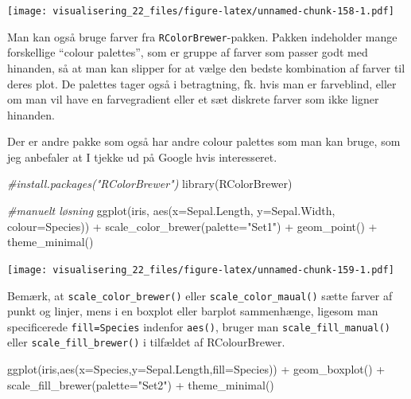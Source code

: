 \documentclass[
]{book}
\newenvironment{Shaded}{\begin{snugshade}}{\end{snugshade}}
\newcommand{\AttributeTok}[1]{\textcolor[rgb]{0.77,0.63,0.00}{#1}}
\newcommand{\CommentTok}[1]{\textcolor[rgb]{0.56,0.35,0.01}{\textit{#1}}}
\newcommand{\FunctionTok}[1]{\textcolor[rgb]{0.00,0.00,0.00}{#1}}
\newcommand{\NormalTok}[1]{#1}
\newcommand{\SpecialCharTok}[1]{\textcolor[rgb]{0.00,0.00,0.00}{#1}}
\newcommand{\StringTok}[1]{\textcolor[rgb]{0.31,0.60,0.02}{#1}}
\begin{document}
\texttt{[image: visualisering\_22\_files/figure-latex/unnamed-chunk-158-1.pdf]}

Man kan også bruge farver fra \texttt{RColorBrewer}-pakken. Pakken indeholder mange forskellige ``colour palettes'', som er gruppe af farver som passer godt med hinanden, så at man kan slipper for at vælge den bedste kombination af farver til deres plot. De palettes tager også i betragtning, fk. hvis man er farveblind, eller om man vil have en farvegradient eller et sæt diskrete farver som ikke ligner hinanden.

Der er andre pakke som også har andre colour palettes som man kan bruge, som jeg anbefaler at I tjekke ud på Google hvis interesseret.

\begin{Shaded}
\begin{Highlighting}[]
\CommentTok{\#install.packages("RColorBrewer")}
\FunctionTok{library}\NormalTok{(RColorBrewer)}

\CommentTok{\#manuelt løsning}
\FunctionTok{ggplot}\NormalTok{(iris, }\FunctionTok{aes}\NormalTok{(}\AttributeTok{x=}\NormalTok{Sepal.Length, }\AttributeTok{y=}\NormalTok{Sepal.Width, }\AttributeTok{colour=}\NormalTok{Species)) }\SpecialCharTok{+}
  \FunctionTok{scale\_color\_brewer}\NormalTok{(}\AttributeTok{palette=}\StringTok{"Set1"}\NormalTok{) }\SpecialCharTok{+}
  \FunctionTok{geom\_point}\NormalTok{() }\SpecialCharTok{+}
  \FunctionTok{theme\_minimal}\NormalTok{() }
\end{Highlighting}
\end{Shaded}

\texttt{[image: visualisering\_22\_files/figure-latex/unnamed-chunk-159-1.pdf]}

Bemærk, at \texttt{scale\_color\_brewer()} eller \texttt{scale\_color\_maual()} sætte farver af punkt og linjer, mens i en boxplot eller barplot sammenhænge, ligesom man specificerede \texttt{fill=Species} indenfor \texttt{aes()}, bruger man \texttt{scale\_fill\_manual()} eller \texttt{scale\_fill\_brewer()} i tilfældet af RColourBrewer.

\begin{Shaded}
\begin{Highlighting}[]
\FunctionTok{ggplot}\NormalTok{(iris,}\FunctionTok{aes}\NormalTok{(}\AttributeTok{x=}\NormalTok{Species,}\AttributeTok{y=}\NormalTok{Sepal.Length,}\AttributeTok{fill=}\NormalTok{Species)) }\SpecialCharTok{+} 
  \FunctionTok{geom\_boxplot}\NormalTok{() }\SpecialCharTok{+}
  \FunctionTok{scale\_fill\_brewer}\NormalTok{(}\AttributeTok{palette=}\StringTok{"Set2"}\NormalTok{)  }\SpecialCharTok{+} 
  \FunctionTok{theme\_minimal}\NormalTok{()}
\end{Highlighting}
\end{Shaded}
\end{document}
